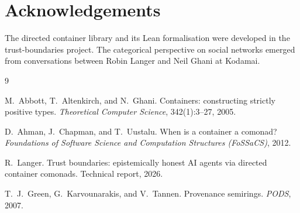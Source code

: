 \documentclass[11pt,a4paper]{article}
\theoremstyle{definition}
\theoremstyle{plain}
\theoremstyle{remark}
\begin{document}
\section*{Acknowledgements}

The directed container library and its Lean formalisation were
developed in the trust-boundaries project. The categorical
perspective on social networks emerged from conversations between
Robin Langer and Neil Ghani at Kodamai.

\begin{thebibliography}{9}

M.~Abbott, T.~Altenkirch, and N.~Ghani.
\newblock Containers: constructing strictly positive types.
\newblock \emph{Theoretical Computer Science}, 342(1):3--27, 2005.

D.~Ahman, J.~Chapman, and T.~Uustalu.
\newblock When is a container a comonad?
\newblock \emph{Foundations of Software Science and Computation Structures (FoSSaCS)}, 2012.

R.~Langer.
\newblock Trust boundaries: epistemically honest AI agents via directed
container comonads.
\newblock Technical report, 2026.

T.~J.~Green, G.~Karvounarakis, and V.~Tannen.
\newblock Provenance semirings.
\newblock \emph{PODS}, 2007.

\end{thebibliography}
\end{document}
